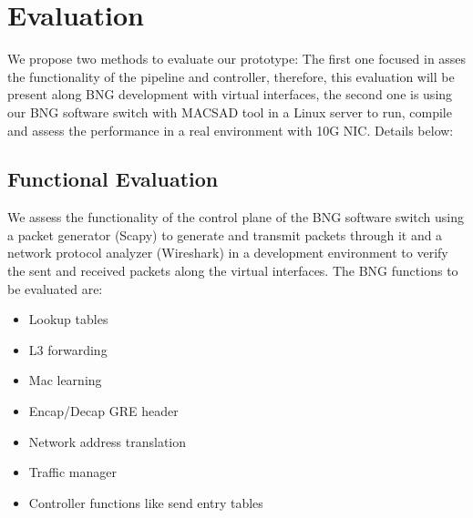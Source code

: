 \chapter{Evaluation}
\label{cap:cap05}


We propose two methods to evaluate our prototype: The first one focused in asses the functionality of the pipeline and controller, therefore, this evaluation will be present along BNG development with virtual interfaces, the second one is using our BNG software switch with MACSAD tool in a Linux server to run, compile and assess the performance in a real environment with 10G NIC. Details below:

\section{Functional Evaluation}
We assess the functionality of the control plane of the BNG software switch using a packet generator (Scapy) to generate and transmit packets through it and a network protocol analyzer (Wireshark) in a development environment to verify the sent and received packets along the virtual interfaces. The BNG functions to be evaluated are: 

\begin{itemize}
	\item Lookup tables
	\item L3 forwarding
	\item Mac learning
	\item Encap/Decap GRE header
	\item Network address translation
	\item Traffic manager 
	\item Controller functions like send entry tables
\end{itemize}

